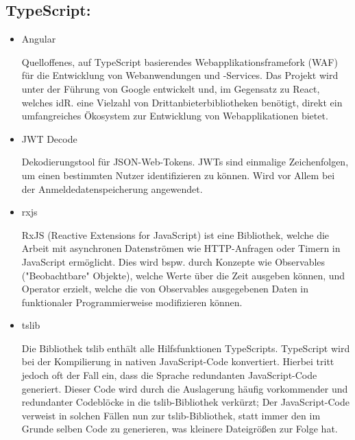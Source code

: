 \documentclass{article}
\begin{document}
\subsection{\textbf{TypeScript:}}
\begin{itemize}
    \item Angular
\begin{itemize}
Quelloffenes, auf TypeScript basierendes Webapplikationsframefork (WAF) für die Entwicklung von Webanwendungen und -Services. Das Projekt wird unter der Führung von Google entwickelt und, im Gegensatz zu React, welches idR. eine Vielzahl von Drittanbieterbibliotheken benötigt, direkt ein umfangreiches Ökosystem zur Entwicklung von Webapplikationen bietet.
\end{itemize}
    \item JWT Decode
\begin{itemize}
Dekodierungstool für JSON-Web-Tokens. JWTs sind einmalige Zeichenfolgen, um einen bestimmten Nutzer identifizieren zu können. Wird vor Allem bei der Anmeldedatenspeicherung angewendet.
\end{itemize}
    \item rxjs
\begin{itemize}
RxJS (Reactive Extensions for JavaScript) ist eine Bibliothek, welche die Arbeit mit asynchronen Datenströmen wie HTTP-Anfragen oder Timern in JavaScript ermöglicht. Dies wird bspw. durch Konzepte wie Observables ("Beobachtbare" Objekte), welche Werte über die Zeit ausgeben können, und Operator erzielt, welche die von Observables ausgegebenen Daten in funktionaler Programmierweise modifizieren können.
\end{itemize}
\item tslib
\begin{itemize}
Die Bibliothek tslib enthält alle Hilfsfunktionen TypeScripts. TypeScript wird bei der Kompilierung in nativen JavaScript-Code konvertiert. Hierbei tritt jedoch oft der Fall ein, dass die Sprache redundanten JavaScript-Code generiert. Dieser Code wird durch die Auslagerung häufig vorkommender und redundanter Codeblöcke in die tslib-Bibliothek verkürzt; Der JavaScript-Code verweist in solchen Fällen nun zur tslib-Bibliothek, statt immer den im Grunde selben Code zu generieren, was kleinere Dateigrößen zur Folge hat.
\end{itemize}





\end{itemize}
\end{document}
